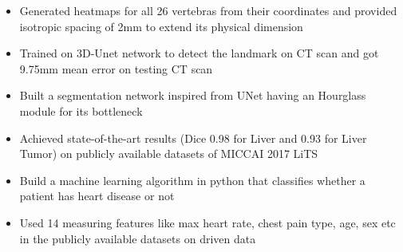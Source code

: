 \documentclass[10pt,a4paper]{altacv}
\begin{document}



\begin{fullwidth}
\makecvheader
\end{fullwidth}


\begin{itemize}
\item Generated heatmaps for all 26 vertebras from their coordinates and provided isotropic spacing of 2mm to extend its physical dimension
\item Trained on 3D-Unet network to detect the landmark on CT scan and got 9.75mm mean error on testing CT scan
\end{itemize}

\begin{itemize}
\item Built a segmentation network inspired from UNet having an Hourglass module for its bottleneck
\item Achieved state-of-the-art results (Dice 0.98 for Liver and 0.93 for Liver Tumor) on publicly available datasets of MICCAI 2017 LiTS
\end{itemize}

\begin{itemize}
\item Build a machine learning algorithm in python that classifies whether a patient
has heart disease or not 
\item Used 14 measuring features like max heart rate, chest pain type, age, sex etc in the publicly available datasets on driven data
\end{itemize}
\end{document}
